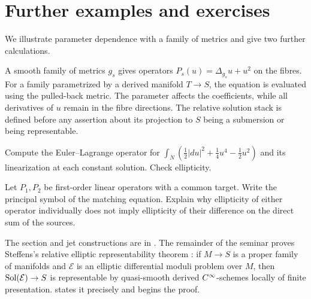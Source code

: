 \section{Further examples and exercises}

We illustrate parameter dependence with a family of metrics and give
two further calculations.

A smooth family of metrics $g_s$ gives operators
$P_s(u)=\Delta_{g_s}u+u^2$ on the fibres. For a family parametrized by
a derived manifold $T\to S$, the equation is evaluated using the
pulled-back metric.
The parameter affects the coefficients, while all derivatives of $u$
remain in the fibre directions.
The relative solution stack is defined before any assertion about
its projection to $S$ being a submersion or being representable.

\begin{exercise}
Compute the Euler--Lagrange operator for
$\int_N(\tfrac12|du|^2+\tfrac14u^4-\tfrac12u^2)$ and its linearization
at each constant solution. Check ellipticity.
\end{exercise}

\begin{exercise}
Let $P_1,P_2$ be first-order linear operators with a common target.
Write the principal symbol of the matching equation.
Explain why ellipticity of either operator individually does not
imply ellipticity of their difference on the direct sum of the sources.
\end{exercise}

The section and jet constructions are in
\cite[Sections~3.2--3.3 and Definitions~3.4.1--3.4.2]
{Steffens_Representability_Elliptic_Moduli}.
The remainder of the seminar proves Steffens's relative elliptic
representability theorem
\cite[Theorem~3.4.3]{Steffens_Representability_Elliptic_Moduli}: if
$M\to S$ is a proper family of manifolds and $\mathcal E$ is an elliptic
differential moduli problem over $M$, then $\operatorname{Sol}(\mathcal E)\to S$ is
representable by quasi-smooth derived $C^\infty$-schemes locally of
finite presentation. 
states it precisely and begins the proof.
